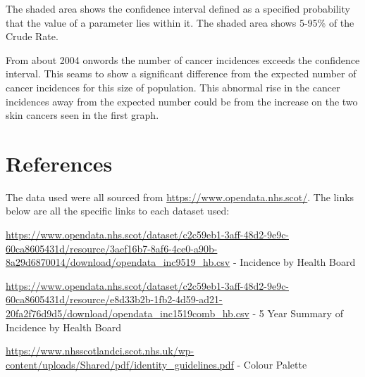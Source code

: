 \documentclass[
]{article}
\begin{document}
The shaded area shows the confidence interval defined as a specified
probability that the value of a parameter lies within it. The shaded
area shows 5-95\% of the Crude Rate.

From about 2004 onwords the number of cancer incidences exceeds the
confidence interval. This seams to show a significant difference from
the expected number of cancer incidences for this size of population.
This abnormal rise in the cancer incidences away from the expected
number could be from the increase on the two skin cancers seen in the
first graph.

\hypertarget{references}{%
\section{References}\label{references}}

The data used were all sourced from
\url{https://www.opendata.nhs.scot/}. The links below are all the
specific links to each dataset used:

\url{https://www.opendata.nhs.scot/dataset/c2c59eb1-3aff-48d2-9e9c-60ca8605431d/resource/3aef16b7-8af6-4ce0-a90b-8a29d6870014/download/opendata_inc9519_hb.csv}
- Incidence by Health Board

\url{https://www.opendata.nhs.scot/dataset/c2c59eb1-3aff-48d2-9e9c-60ca8605431d/resource/e8d33b2b-1fb2-4d59-ad21-20fa2f76d9d5/download/opendata_inc1519comb_hb.csv}
- 5 Year Summary of Incidence by Health Board

\url{https://www.nhsscotlandci.scot.nhs.uk/wp-content/uploads/Shared/pdf/identity_guidelines.pdf}
- Colour Palette
\end{document}
